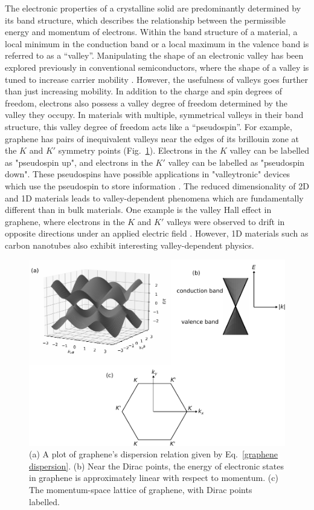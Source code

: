 \documentclass[double,12pt,1in,seploa]{beavtex}
\begin{document}
The electronic properties of a crystalline solid are predominantly determined by its band structure, which describes the relationship between the permissible energy and momentum of electrons. Within the band structure of a material, a local minimum in the conduction band or a local maximum in the valence band is referred to as a “valley”. Manipulating the shape of an electronic valley has been explored previously in conventional semiconductors, where the shape of a valley is tuned to increase carrier mobility \cite{thompson_90-nm_2004}. However, the usefulness of valleys goes further than just increasing mobility. In addition to the charge and spin degrees of freedom, electrons also possess a valley degree of freedom determined by the valley they occupy. In materials with multiple, symmetrical valleys in their band structure, this valley degree of freedom acts like a “pseudospin”. For example, graphene has pairs of inequivalent valleys near the edges of its brillouin zone at the $K$ and $K'$ symmetry points (Fig.\ \ref{graphene dispersion plot intro}). Electrons in the $K$ valley can be labelled as "pseudospin up", and electrons in the $K'$ valley can be labelled as "pseudospin down". These pseudospins have possible applications in "valleytronic" devices which use the pseudospin to store information \cite{schaibley_valleytronics_2016}. The reduced dimensionality of 2D and 1D materials leads to valley-dependent phenomena which are fundamentally different than in bulk materials. One example is the valley Hall effect in graphene, where electrons in the $K$ and $K'$ valleys were observed to drift in opposite directions under an applied electric field \cite{gorbachev_detecting_2014}. However, 1D materials such as carbon nanotubes also exhibit interesting valley-dependent physics.

\begin{figure}
    \includegraphics[width = 1\textwidth]{Graphene band structure 3D.pdf}
    \caption{(a) A plot of graphene's dispersion relation given by Eq.\ \ref{graphene dispersion}. (b) Near the Dirac points, the energy of electronic states in graphene is approximately linear with respect to momentum. (c) The momentum-space lattice of graphene, with Dirac points labelled.}
    \label{graphene dispersion plot intro}
\end{figure}
\end{document}
